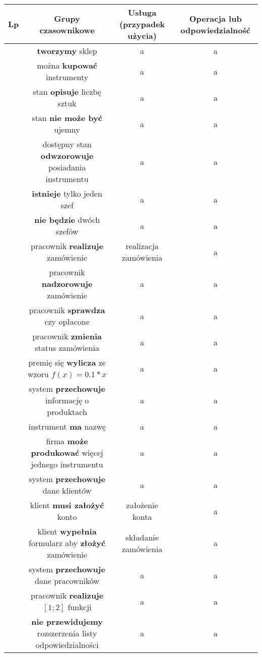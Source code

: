 \documentclass[a4page]{article}
\begin{document}
\begin{table}
\begin{adjustwidth}{-4.5cm}{}
\begin{tabular}{|c|c|c|c|}
				\hline
					Lp & Grupy czasownikowe & Usługa (przypadek użycia) & Operacja lub odpowiedzialność\\
				\hline
					\next & \textbf{tworzymy} sklep & a & a\\
				\hline
					\next & można \textbf{kupować} instrumenty & a & a\\
				\hline
					\next & stan \textbf{opisuje} liczbę sztuk & a & a\\
				\hline
					\next & stan \textbf{nie może być} ujemny & a & a\\
				\hline
					\next & dostępny stan \textbf{odwzorowuje} posiadania instrumentu & a & a\\
				\hline
					\next & \textbf{istnieje} tylko jeden szef & a & a\\
				\hline
					\next & \textbf{nie będzie} dwóch szefów & a & a\\
				\hline
					\next & pracownik \textbf{realizuje} zamówienie & realizacja zamówienia & a\\
				\hline
					\next & pracownik \textbf{nadzorowuje} zamówienie & a & a\\
				\hline
					\next & pracownik \textbf{sprawdza} czy opłacone & a & a\\
				\hline
					\next & pracownik \textbf{zmienia} status zamówienia & a & a\\
				\hline
					\next & premię się \textbf{wylicza} ze wzoru $f(x) = 0.1 * x$& a & a\\
				\hline
					\next & system \textbf{przechowuje} informację o produktach & a & a\\
				\hline
					\next & instrument \textbf{ma} nazwę & a & a\\
				\hline
					\next & firma \textbf{może produkować} więcej jednego instrumentu & a & a\\
				\hline
					\next & system \textbf{przechowuje} dane klientów & a & a\\
				\hline
					\next & klient \textbf{musi założyć} konto & założenie konta & a\\
				\hline
					\next & klient \textbf{wypełnia} formularz aby \textbf{złożyć} zamówienie & składanie zamówienia & a\\
				\hline
					\next & system \textbf{przechowuje} dane pracowników & a & a\\
				\hline
					\next & pracownik \textbf{realizuje} $[1; 2]$ funkcji & a & a\\
				\hline
					\next & \textbf{nie przewidujemy} rozszerzenia listy odpowiedzialności & a & a\\

\end{tabular}
\end{adjustwidth}
\end{table}
\end{document}
